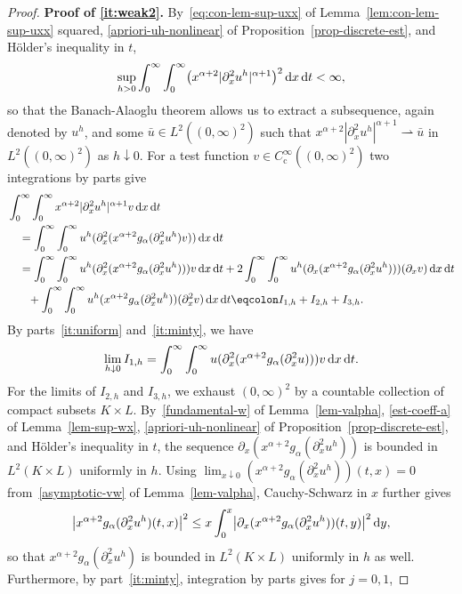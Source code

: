 \documentclass[reqno,12pt]{amsart}
\renewcommand{\d}{\ensuremath{\mathrm{d}}}
\renewcommand{\d}{\ensuremath{{\rm d}}}
\numberwithin{equation}{section}
\begin{document}
\begin{proof}
%
\textbf{Proof of \eqref{it:weak2}. }
%
By~\eqref{eq:con-lem-sup-uxx} of Lemma~\ref{lem:con-lem-sup-uxx} squared, \eqref{apriori-uh-nonlinear} of Proposition~\ref{prop-discrete-est}, and H\"older's inequality in $t$,
%
\[
\sup_{h > 0} \int_0^\infty \int_0^\infty \bigl(x^{\alpha+2} |\partial_x^2 u^h|^{\alpha+1}\bigr)^2 \, \d x \, \d t < \infty,
\]
%
so that the Banach-Alaoglu theorem allows us to extract a subsequence, again denoted by $u^h$, and some $\bar u \in L^2((0,\infty)^2)$ such that $x^{\alpha+2} |\partial_x^2 u^h|^{\alpha+1} \rightharpoonup \bar u$ in $L^2((0,\infty)^2)$ as $h \downarrow 0$. For a test function $v \in C^\infty_\mathrm{c}((0,\infty)^2)$ two integrations by parts give
%
\begin{align*}
& \int_0^\infty \int_0^\infty x^{\alpha+2} |\partial_x^2 u^h|^{\alpha+1} v \, \d x \, \d t \\
& \quad = \int_0^\infty \int_0^\infty u^h (\partial_x^2(x^{\alpha+2} g_\alpha(\partial_x^2 u^h) v)) \, \d x \, \d t \\
& \quad = \int_0^\infty \int_0^\infty u^h (\partial_x^2(x^{\alpha+2} g_\alpha(\partial_x^2 u^h))) v \, \d x \, \d t + 2 \int_0^\infty \int_0^\infty u^h (\partial_x(x^{\alpha+2} g_\alpha(\partial_x^2 u^h))) (\partial_x v) \, \d x \, \d t \\
& \quad \phantom{=} + \int_0^\infty \int_0^\infty u^h (x^{\alpha+2} g_\alpha(\partial_x^2 u^h)) (\partial_x^2 v) \, \d x \, \d t \eqcolon I_{1,h} + I_{2,h} + I_{3,h}.
\end{align*}
%
By parts~\eqref{it:uniform} and~\eqref{it:minty}, we have
%
\[
\lim_{h \downarrow 0} I_{1,h} = \int_0^\infty \int_0^\infty u (\partial_x^2(x^{\alpha+2} g_\alpha(\partial_x^2 u))) v \, \d x \, \d t.
\]
%
For the limits of $I_{2,h}$ and $I_{3,h}$, we exhaust $(0,\infty)^2$ by a countable collection of compact subsets $K \times L$. By~\eqref{fundamental-w} of Lemma~\ref{lem-valpha}, \eqref{est-coeff-a} of Lemma~\ref{lem-sup-wx}, \eqref{apriori-uh-nonlinear} of Proposition~\ref{prop-discrete-est}, and H\"older's inequality in $t$, the sequence $\partial_x(x^{\alpha+2} g_\alpha(\partial_x^2 u^h))$ is bounded in $L^2(K \times L)$ uniformly in $h$. Using $\lim_{x \downarrow 0} (x^{\alpha+2} g_\alpha(\partial_x^2 u^h))(t,x) = 0$ from~\eqref{asymptotic-vw} of Lemma~\ref{lem-valpha}, Cauchy-Schwarz in $x$ further gives
%
\[
\bigl|x^{\alpha+2} g_\alpha(\partial_x^2 u^h)(t,x)\bigr|^2 \le x \int_0^x \bigl|\partial_x(x^{\alpha+2} g_\alpha(\partial_x^2 u^h))(t,y)\bigr|^2 \, \d y,
\]
%
so that $x^{\alpha+2} g_\alpha(\partial_x^2 u^h)$ is bounded in $L^2(K \times L)$ uniformly in $h$ as well. Furthermore, by part~\eqref{it:minty}, integration by parts gives for $j = 0, 1$,

\end{proof}
\end{document}
